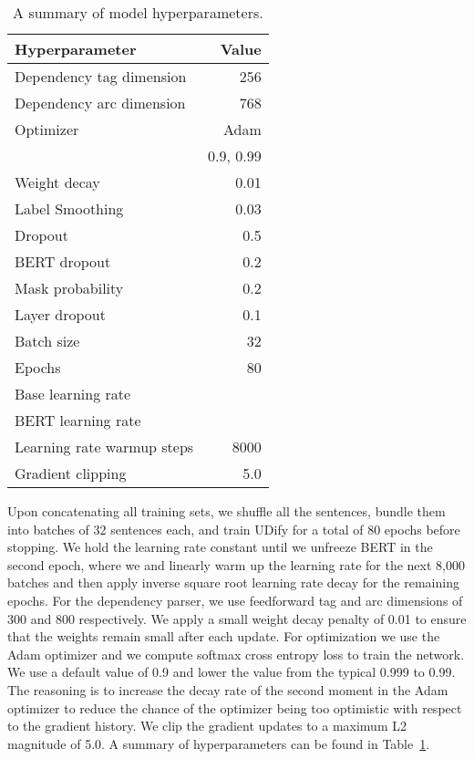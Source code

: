 \documentclass[11pt,a4paper]{article}
\begin{document}
\begin{table}[htbp]
\small
    \begin{center}
    \begin{tabular}{@{}lr@{}}
    \toprule
        \sc Hyperparameter & \sc Value \\
    \midrule
        Dependency tag dimension       & 256 \\
        Dependency arc dimension       & 768 \\
        Optimizer          & Adam \\
          & 0.9, 0.99 \\
        Weight decay       & 0.01 \\
        Label Smoothing    & 0.03 \\
        Dropout            & 0.5 \\
        BERT dropout       & 0.2 \\
        Mask probability   & 0.2 \\
        Layer dropout      & 0.1 \\
        Batch size         & 32 \\
        Epochs             & 80 \\
        Base learning rate            &  \\
        BERT learning rate            &  \\
        Learning rate warmup steps    & 8000 \\
        Gradient clipping  & 5.0 \\
    \bottomrule
    \end{tabular}
    \end{center}
    \caption{\label{table:hyperparameters}
        A summary of model hyperparameters.
    }
\end{table}

Upon concatenating all training sets, we shuffle all the sentences, bundle them into batches of 32 sentences each, and train UDify for a total of 80 epochs before stopping.
We hold the learning rate constant until we unfreeze BERT in the second epoch, where we and linearly warm up the learning rate for the next 8,000 batches and then apply inverse square root learning rate decay for the remaining epochs.
For the dependency parser, we use feedforward tag and arc dimensions of 300 and 800 respectively.
We apply a small weight decay penalty of 0.01 to ensure that the weights remain small after each update.
For optimization we use the Adam optimizer and we compute softmax cross entropy loss to train the network.
We use a default  value of 0.9 and lower the  value from the typical 0.999 to 0.99. The reasoning is to increase the decay rate of the second moment in the Adam optimizer to reduce the chance of the optimizer being too optimistic with respect to the gradient history.
We clip the gradient updates to a maximum L2 magnitude of 5.0. A summary of hyperparameters can be found in Table~\ref{table:hyperparameters}.
\end{document}
